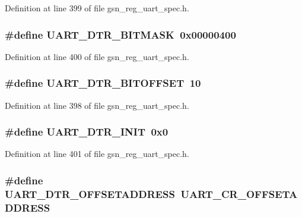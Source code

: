 Definition at line 399 of file gsn\_\-reg\_\-uart\_\-spec.h.

\hypertarget{a00575_aebee2d047f09e3e1a626a0e29e1cb9ea}{
\subsubsection[{UART\_\-DTR\_\-BITMASK}]{\setlength{\rightskip}{0pt plus 5cm}\#define UART\_\-DTR\_\-BITMASK~0x00000400}}
\label{a00575_aebee2d047f09e3e1a626a0e29e1cb9ea}


Definition at line 400 of file gsn\_\-reg\_\-uart\_\-spec.h.

\hypertarget{a00575_acd1a55e04576ec52e3c764cba702f422}{
\subsubsection[{UART\_\-DTR\_\-BITOFFSET}]{\setlength{\rightskip}{0pt plus 5cm}\#define UART\_\-DTR\_\-BITOFFSET~10}}
\label{a00575_acd1a55e04576ec52e3c764cba702f422}


Definition at line 398 of file gsn\_\-reg\_\-uart\_\-spec.h.

\hypertarget{a00575_ad5e6cb115ac887903e4d159ac7a9b153}{
\subsubsection[{UART\_\-DTR\_\-INIT}]{\setlength{\rightskip}{0pt plus 5cm}\#define UART\_\-DTR\_\-INIT~0x0}}
\label{a00575_ad5e6cb115ac887903e4d159ac7a9b153}


Definition at line 401 of file gsn\_\-reg\_\-uart\_\-spec.h.

\hypertarget{a00575_a051140ac546140b57fffd05f65df6947}{
\subsubsection[{UART\_\-DTR\_\-OFFSETADDRESS}]{\setlength{\rightskip}{0pt plus 5cm}\#define UART\_\-DTR\_\-OFFSETADDRESS~UART\_\-CR\_\-OFFSETADDRESS}}
\label{a00575_a051140ac546140b57fffd05f65df6947}


